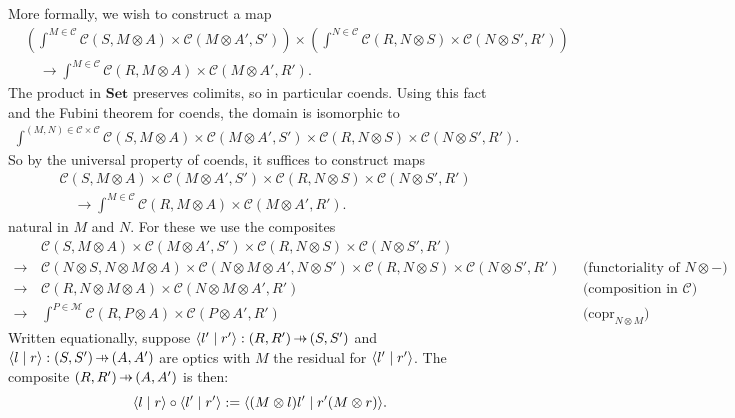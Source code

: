 \documentclass[11pt,letterpaper]{article}
\theoremstyle{plain}
\theoremstyle{definition}
\newcommand{\C}{\mathscr{C}}
\newcommand{\M}{\mathscr{M}}
\newcommand{\Set}{\mathbf{Set}}
\DeclareMathOperator{\copr}{copr}
\newcommand{\rep}[2]{{\ensuremath \left\langle #1 \mid #2 \right\rangle}}
\newcommand{\hto}{\ensuremath{\,\mathaccent\shortmid\rightarrow\,}}
\begin{document}
More formally, we wish to construct a map
\begin{align*}
  &\left(\int^{M \in \C} \C(S, M \otimes A) \times \C(M \otimes A', S')\right) \times \left(\int^{N \in \C} \C(R, N \otimes S) \times \C(N \otimes S', R')\right) \\
  &\quad \to \int^{M \in \C} \C(R, M \otimes A) \times \C(M \otimes A', R').
\end{align*}
The product in $\Set$ preserves colimits, so in particular coends. Using this fact and the Fubini theorem for coends, the domain is isomorphic to
\begin{align*}
  \int^{(M, N) \in \C \times \C} \C(S, M \otimes A) \times \C(M \otimes A', S') \times \C(R, N \otimes S) \times \C(N \otimes S', R').
\end{align*}
So by the universal property of coends, it suffices to construct maps
\begin{align*}
  & \C(S, M \otimes A) \times \C(M \otimes A', S') \times \C(R, N \otimes S) \times \C(N \otimes S', R') \\ &
                                                                                                              \quad \to \int^{M \in \C} \C(R, M \otimes A) \times \C(M \otimes A', R').
\end{align*}
natural in $M$ and $N$. For these we use the composites
\begin{align*}
  &\C(S, M \otimes A) \times \C(M \otimes A', S') \times \C(R, N \otimes S) \times \C(N \otimes S', R')\\
  \to \,& \C(N \otimes S, N \otimes M \otimes A) \times \C(N \otimes M \otimes A', N \otimes S') \times \C(R, N \otimes S) \times \C(N \otimes S', R') && \text{(functoriality of $N \otimes  -$)} \\
  \to \,& \C(R, N \otimes  M \otimes A) \times \C(N \otimes M \otimes A', R') && \text{(composition in $\C$)} \\
  \to \,&\int^{P \in \M} \C(R, P \otimes A) \times \C(P \otimes A', R') && \text{($\copr_{N \otimes M}$)}
\end{align*}
Written equationally, suppose $\rep{l'}{r'} : (R, R') \hto (S, S')$ and $\rep{l}{r} : (S, S') \hto (A, A')$ are optics with $M$ the residual for $\rep{l'}{r'}$. The composite $(R, R') \hto (A, A')$ is then: \[\rep{l}{r} \circ \rep{l'}{r'} := \rep{(M \otimes l)l'}{r'(M \otimes r)}.\]
\end{document}
